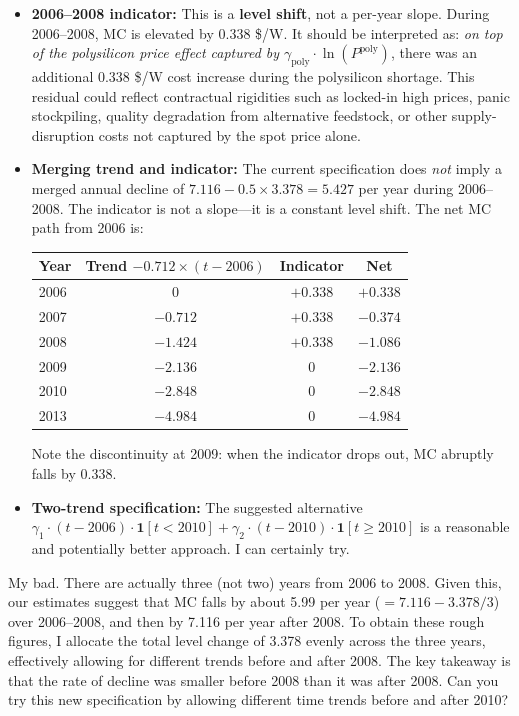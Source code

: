 \documentclass[12pt]{article}
\begin{document}
\begin{enumerate}
{\begin{itemize}[leftmargin=2em]
        \item \textbf{2006--2008 indicator:} This is a \textbf{level shift}, not a per-year slope. During 2006--2008, MC is elevated by 0.338 \$/W. It should be interpreted as: \textit{on top of the polysilicon price effect captured by $\gamma_{\text{poly}} \cdot \ln(P^{\text{poly}})$}, there was an additional 0.338 \$/W cost increase during the polysilicon shortage. This residual could reflect contractual rigidities such as locked-in high prices, panic stockpiling, quality degradation from alternative feedstock, or other supply-disruption costs not captured by the spot price alone.

        \item \textbf{Merging trend and indicator:} The current specification does \textit{not} imply a merged annual decline of $7.116 - 0.5 \times 3.378 = 5.427$ per year during 2006--2008. The indicator is not a slope---it is a constant level shift. The net MC path from 2006 is:
        \begin{center}
        \begin{tabular}{lccc}
        \toprule
        Year & Trend $-0.712 \times (t-2006)$ & Indicator & Net \\
        \midrule
        2006 & $0$ & $+0.338$ & $+0.338$ \\
        2007 & $-0.712$ & $+0.338$ & $-0.374$ \\
        2008 & $-1.424$ & $+0.338$ & $-1.086$ \\
        2009 & $-2.136$ & $0$ & $-2.136$ \\
        2010 & $-2.848$ & $0$ & $-2.848$ \\
        2013 & $-4.984$ & $0$ & $-4.984$ \\
        \bottomrule
        \end{tabular}
        \end{center}
        Note the discontinuity at 2009: when the indicator drops out, MC abruptly falls by 0.338.

        \item \textbf{Two-trend specification:} The suggested alternative $\gamma_1 \cdot (t-2006) \cdot \mathbf{1}[t<2010] + \gamma_2 \cdot (t-2010) \cdot \mathbf{1}[t \geq 2010]$ is a reasonable and potentially better approach. I can certainly try.
    \end{itemize}
    }

    {\color{red} My bad. There are actually three (not two) years from 2006 to 2008. Given this, our estimates suggest that MC falls by about 5.99 per year ($ = 7.116 - 3.378/3 $) over 2006–2008, and then by 7.116 per year after 2008. To obtain these rough figures, I allocate the total level change of 3.378 evenly across the three years, effectively allowing for different trends before and after 2008. The key takeaway is that the rate of decline was smaller before 2008 than it was after 2008. Can you try this new specification by allowing different time trends before and after 2010?
    }
 {\color{answerblue}

}
\end{enumerate}
\end{document}
